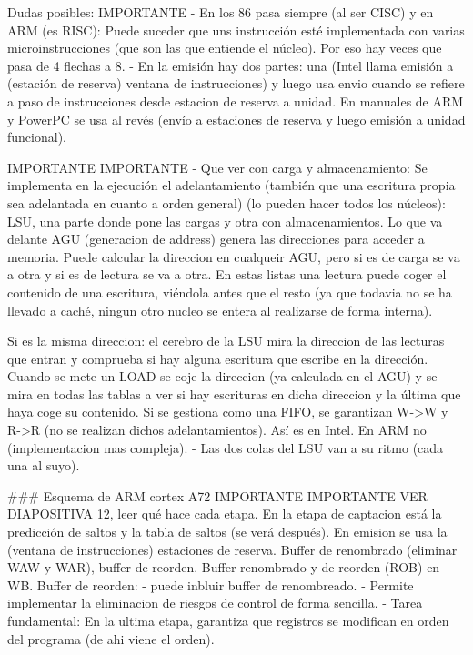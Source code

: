 Dudas posibles: IMPORTANTE
- En los 86 pasa siempre (al ser CISC) y en ARM (es RISC): Puede suceder que uns instrucción esté implementada con varias microinstrucciones (que son las que entiende el núcleo). Por eso hay veces que pasa de 4 flechas a 8.
- En la emisión hay dos partes: una (Intel llama emisión a (estación de reserva) ventana de instrucciones) y luego usa envio cuando se refiere a paso de instrucciones desde estacion de reserva a unidad. En manuales de ARM y PowerPC se usa al revés (envío a estaciones de reserva y luego emisión a unidad funcional).

IMPORTANTE 
IMPORTANTE 
- Que ver con carga y almacenamiento: Se implementa en la ejecución el adelantamiento (también que una escritura propia sea adelantada en cuanto a orden general) (lo pueden hacer todos los núcleos): LSU, una parte donde pone las cargas y otra con almacenamientos. Lo que va delante AGU (generacion de address) genera las direcciones para acceder a memoria. Puede calcular la direccion en cualqueir AGU, pero si es de carga se va a otra y si es de lectura se va a otra. En estas listas una lectura puede coger el contenido de una escritura, viéndola antes que el resto (ya que todavia no se ha llevado a caché, ningun otro nucleo se entera al realizarse de forma interna).

Si es la misma direccion: el cerebro de la LSU mira la direccion de las lecturas que entran y comprueba si hay alguna escritura que escribe en la dirección. Cuando se mete un LOAD se coje la direccion (ya calculada en el AGU) y se mira en todas las tablas a ver si hay escrituras en dicha direccion y la última que haya coge su contenido.
Si se gestiona como una FIFO, se garantizan W->W y R->R (no se realizan dichos adelantamientos). Así es en Intel. En ARM no (implementacion mas compleja).
- Las dos colas del LSU van a su ritmo (cada una al suyo). 

### Esquema de ARM cortex A72
IMPORTANTE
IMPORTANTE
VER DIAPOSITIVA 12, leer qué hace cada etapa.
En la etapa de captacion está la predicción de saltos y la tabla de saltos (se verá después).
En emision se usa la (ventana de instrucciones) estaciones de reserva. Buffer de renombrado (eliminar WAW y WAR), buffer de reorden.
Buffer renombrado y de reorden (ROB) en WB.
Buffer de reorden: 
- puede inbluir buffer de renombreado.
- Permite implementar la eliminacion de riesgos de control de forma sencilla.
- Tarea fundamental: En la ultima etapa, garantiza que registros se modifican en orden del programa (de ahi viene el orden).

